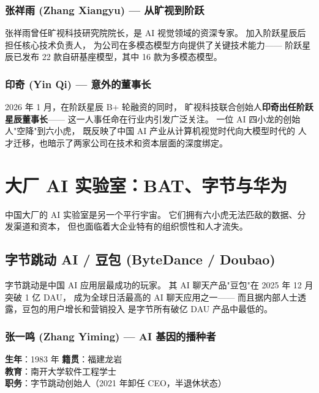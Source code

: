 \subsubsection{张祥雨 (Zhang Xiangyu) — 从旷视到阶跃}

张祥雨曾任旷视科技研究院院长，是 AI 视觉领域的资深专家。
加入阶跃星辰后担任核心技术负责人，
为公司在多模态模型方向提供了关键技术能力——
阶跃星辰已发布 22 款自研基座模型，其中 16 款为多模态模型。

\subsubsection{印奇 (Yin Qi) — 意外的董事长}

2026 年 1 月，在阶跃星辰 B+ 轮融资的同时，
旷视科技联合创始人\textbf{印奇出任阶跃星辰董事长}——
这一人事任命在行业内引发广泛关注。
一位 AI 四小龙的创始人"空降"到六小虎，
既反映了中国 AI 产业从计算机视觉时代向大模型时代的
人才迁移，也暗示了两家公司在技术和资本层面的深度绑定。



\section{大厂 AI 实验室：BAT、字节与华为}
\label{sec:bigtech}

中国大厂的 AI 实验室是另一个平行宇宙。
它们拥有六小虎无法匹敌的数据、分发渠道和资本，
但也面临着大企业特有的组织惯性和人才流失。


\subsection{字节跳动 AI / 豆包 (ByteDance / Doubao)}

字节跳动是中国 AI 应用层最成功的玩家。
其 AI 聊天产品"豆包"在 2025 年 12 月突破 1 亿 DAU，
成为全球日活最高的 AI 聊天应用之一——
而且据内部人士透露，豆包的用户增长和营销投入
是字节所有破亿 DAU 产品中最低的。

\subsubsection{张一鸣 (Zhang Yiming) — AI 基因的播种者}

\begin{keybox}
\textbf{生年}：1983 年 \quad \textbf{籍贯}：福建龙岩 \\
\textbf{教育}：南开大学软件工程学士 \\
\textbf{职务}：字节跳动创始人（2021 年卸任 CEO，半退休状态）
\end{keybox}

